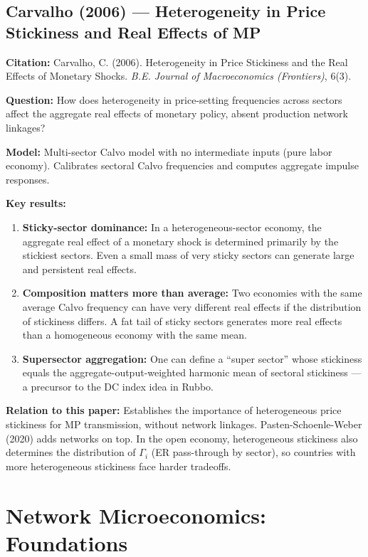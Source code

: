 \documentclass[12pt]{article}
\begin{document}
\subsection{Carvalho (2006) --- Heterogeneity in Price Stickiness and Real Effects of MP}

\textbf{Citation:} Carvalho, C. (2006). Heterogeneity in Price Stickiness and the Real Effects of Monetary Shocks. \textit{B.E. Journal of Macroeconomics (Frontiers)}, 6(3).

\textbf{Question:} How does heterogeneity in price-setting frequencies across sectors affect the aggregate real effects of monetary policy, absent production network linkages?

\textbf{Model:} Multi-sector Calvo model with no intermediate inputs (pure labor economy). Calibrates sectoral Calvo frequencies and computes aggregate impulse responses.

\textbf{Key results:}
\begin{enumerate}
    \item \textbf{Sticky-sector dominance:} In a heterogeneous-sector economy, the aggregate real effect of a monetary shock is determined primarily by the stickiest sectors. Even a small mass of very sticky sectors can generate large and persistent real effects.
    \item \textbf{Composition matters more than average:} Two economies with the same average Calvo frequency can have very different real effects if the distribution of stickiness differs. A fat tail of sticky sectors generates more real effects than a homogeneous economy with the same mean.
    \item \textbf{Supersector aggregation:} One can define a ``super sector'' whose stickiness equals the aggregate-output-weighted harmonic mean of sectoral stickiness --- a precursor to the DC index idea in Rubbo.
\end{enumerate}

\textbf{Relation to this paper:} Establishes the importance of heterogeneous price stickiness for MP transmission, without network linkages. Pasten-Schoenle-Weber (2020) adds networks on top. In the open economy, heterogeneous stickiness also determines the distribution of $\Gamma_i$ (ER pass-through by sector), so countries with more heterogeneous stickiness face harder tradeoffs.

\section{Network Microeconomics: Foundations}
\end{document}
